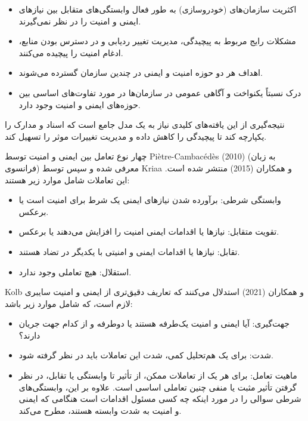 \documentclass[a4paper,10pt]{article}
\begin{document}
        \begin{itemize}
            
            \item اکثریت سازمان‌های (خودروسازی) به طور فعال وابستگی‌های متقابل بین نیازهای ایمنی و امنیت را در نظر نمی‌گیرند.

            \item مشکلات رایج مربوط به پیچیدگی، مدیریت تغییر ردیابی و در دسترس بودن منابع، ادغام امنیت را پیچیده می‌کنند.

            \item اهداف هر دو حوزه امنیت و ایمنی در چندین سازمان گسترده می‌شوند.

            \item درک نسبتاً یکنواخت و آگاهی عمومی در سازمان‌ها در مورد تفاوت‌های اساسی بین حوزه‌های ایمنی و امنیت وجود دارد.

        \end{itemize}

        نتیجه‌گیری از این یافته‌های کلیدی نیاز به یک مدل جامع است که اسناد و مدارک را یکپارچه کند تا پیچیدگی را کاهش داده و مدیریت تغییرات موثر را تسهیل کند.

        چهار نوع تعامل بین ایمنی و امنیت توسط Piètre-Cambacédès (2010) (به زبان فرانسوی) معرفی شده و سپس توسط Kriaa و همکاران (2015) منتشر شده است. این تعاملات شامل موارد زیر هستند:

        \begin{itemize}
            
            \item وابستگی شرطی: برآورده شدن نیازهای ایمنی یک شرط برای امنیت است یا برعکس.

            \item تقویت متقابل: نیازها یا اقدامات ایمنی امنیت را افزایش می‌دهند یا برعکس.

            \item تقابل: نیازها یا اقدامات ایمنی و امنیتی با یکدیگر در تضاد هستند.

            \item استقلال: هیچ تعاملی وجود ندارد.

        \end{itemize}

        Kolb و همکاران (2021) استدلال می‌کنند که تعاریف دقیق‌تری از ایمنی و امنیت سایبری لازم است، که شامل موارد زیر باشد:

        \begin{itemize}
            
            \item جهت‌گیری: آیا ایمنی و امنیت یک‌طرفه هستند یا دوطرفه و از کدام جهت جریان دارند؟

            \item شدت: برای یک هم‌تحلیل کمی، شدت این تعاملات باید در نظر گرفته شود.

            \item ماهیت تعامل: برای هر یک از تعاملات ممکن، از تأثیر تا وابستگی یا تقابل، در نظر گرفتن تأثیر مثبت یا منفی چنین تعاملی اساسی است. علاوه بر این، وابستگی‌های شرطی سوالی را در مورد اینکه چه کسی مسئول اقدامات است هنگامی که ایمنی و امنیت به شدت وابسته هستند، مطرح می‌کند.

        \end{itemize}
\end{document}
